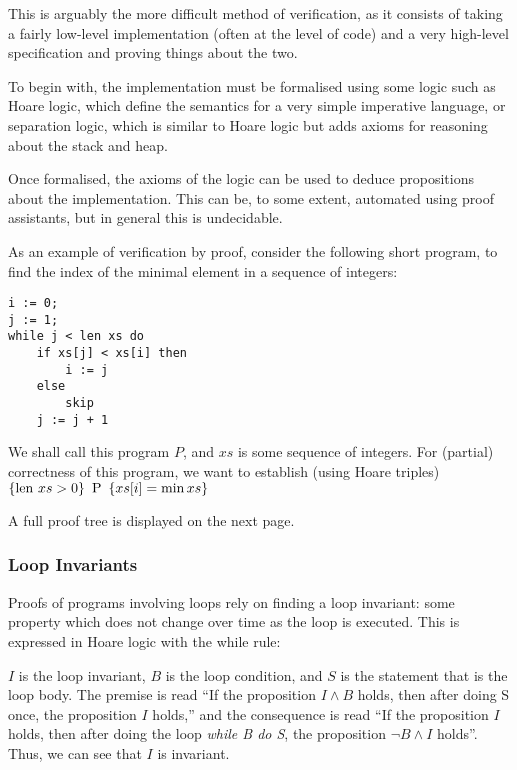 This is arguably the more difficult method of verification, as it
consists of taking a fairly low-level implementation (often at the
level of code) and a very high-level specification and proving things
about the two.

To begin with, the implementation must be formalised using some logic
such as Hoare logic\cite{Hoare69}, which define the semantics for a
very simple imperative language, or separation logic\cite{Reynolds02},
which is similar to Hoare logic but adds axioms for reasoning about
the stack and heap.

Once formalised, the axioms of the logic can be used to deduce
propositions about the implementation. This can be, to some extent,
automated using proof assistants, but in general this is undecidable.

As an example of verification by proof, consider the following short
program, to find the index of the minimal element in a sequence of
integers:

\begin{verbatim}
i := 0;
j := 1;
while j < len xs do
    if xs[j] < xs[i] then
        i := j
    else
        skip
    j := j + 1
\end{verbatim}

We shall call this program $P$, and $xs$ is some sequence of
integers. For (partial) correctness of this program, we want to
establish (using Hoare triples) $\htriple{\len xs > 0}{P}{xs[i] = \min
  xs}$

A full proof tree is displayed on the next page.

\subsubsection{Loop Invariants}

Proofs of programs involving loops rely on finding a loop invariant:
some property which does not change over time as the loop is
executed. This is expressed in Hoare logic with the while rule:

\begin{prooftree}
\end{prooftree}

$I$ is the loop invariant, $B$ is the loop condition, and $S$ is the
statement that is the loop body. The premise is read ``If the
proposition $I \land B$ holds, then after doing S once, the
proposition $I$ holds,'' and the consequence is read ``If the
proposition $I$ holds, then after doing the loop \textit{while B do
  S}, the proposition $\lnot B \land I$ holds''. Thus, we can see that
$I$ is invariant.


